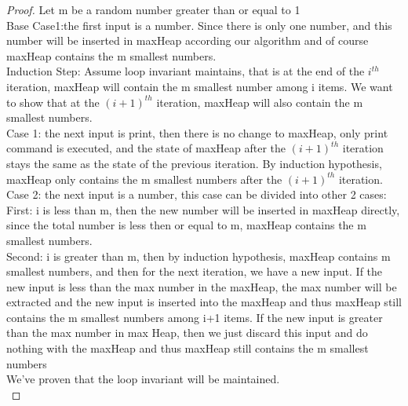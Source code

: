 \documentclass[11pt]{article}
\begin{document}
\begin{proof}
Let m be a random number greater than or equal to 1\\
Base Case1:the first input is a number. Since there is only one number, and this number will be inserted in maxHeap according our algorithm and of course maxHeap contains the m smallest numbers.\\
Induction Step: Assume loop invariant maintains, that is at the end of the $i^{th}$ iteration, maxHeap will contain the m smallest number among i items. We want to show that at the $(i+1)^{th}$ iteration, maxHeap will also contain the m smallest numbers.\\
Case 1: the next input is print, then there is no change to maxHeap, only print command is executed, and the state of maxHeap after the $(i+1)^{th}$ iteration stays the same as the state of the previous iteration. By induction hypothesis, maxHeap only contains the m smallest numbers after the $(i+1)^{th}$ iteration.\\
Case 2: the next input is a number, this case can be divided into other 2 cases:\\
First: i is less than m, then the new number will be inserted in maxHeap directly, since the total number is less then or equal to m, maxHeap contains the m smallest numbers.\\
Second: i is greater than m, then by induction hypothesis, maxHeap contains m smallest numbers, and then for the next iteration, we have a new input. If the new input is less than the max number in the maxHeap, the max number will be extracted and the new input is inserted into the maxHeap and thus maxHeap still contains the m smallest numbers among i+1 items. If the new input is greater than the max number in max Heap, then we just discard this input and do nothing with the maxHeap and thus maxHeap still contains the m smallest numbers\\
We've proven that the loop invariant will be maintained.\\
\end{proof}
\end{document}
